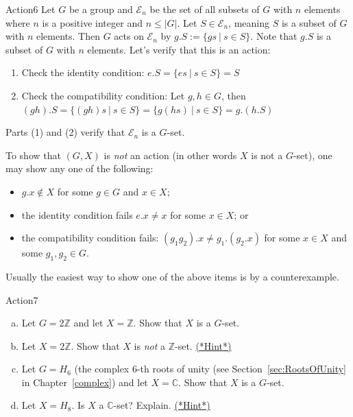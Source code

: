 \begin{example}{Action6}
Let $G$ be a group and $\mathcal{E}_n$ be the set of all subsets of $G$ with $n$ elements where $n$ is a positive integer and $n\leq |G|$. Let $S \in \mathcal{E}_n$, meaning $S$ is a subset of $G$ with $n$ elements. Then $G$ acts on $\mathcal{E}_n$ by $g.S:=\{gs~|~s \in S\}$. Note that $g.S$ is a subset of $G$ with $n$ elements. Let's verify that this is an action:
\begin{enumerate}[(1)]
\item Check the identity condition: $e.S=\{es~|~s \in S\}=S$
\item Check the compatibility condition: Let $g,h \in G$, then $(gh).S=\{(gh)s~|~s \in S\}=\{g(hs)~|~s \in S\}=g.(h.S)$
\end{enumerate}
Parts (1) and (2) verify that $\mathcal{E}_n$ is a $G$-set.
\end{example}

To show that $(G,X)$ is \emph{not} an action (in other words $X$ is not a $G$-set), one may show any one of the following:
\begin{itemize}
\item $g.x \notin X$ for some $g \in G$ and $x \in X$;
\item the identity condition fails $e.x \neq x$ for some $x\in X$; or
\item the compatibility condition fails: $(g_1g_2).x \neq g_1.(g_2.x)$ for some $x\in X$ and some $g_1, g_2 \in G$.
\end{itemize}
Usually the easiest way to show one of the above items is by a counterexample.

\begin{exercise}{Action7}
\begin{enumerate}[(a)]
\item 
Let $G = 2\mathbb{Z}$ and let $X =\mathbb{Z}$. Show that $X$ is a $G$-set.
\item Let $X = 2\mathbb{Z}$. Show that $X$ is \emph{not} a $\mathbb{Z}$-set.
\hyperref[sec:actions:hints]{(*Hint*)}
\item Let $G = H_6$ (the complex $6$-th roots of unity (see Section~\ref{sec:RootsOfUnity} in Chapter~\ref{complex}) and let $X =\mathbb{C}$. Show that $X$ is a $G$-set.
\item Let $X = H_8$.  Is $X$ a $\mathbb{C}$-set? Explain.
\hyperref[sec:actions:hints]{(*Hint*)}
\end{enumerate}
\end{exercise}


